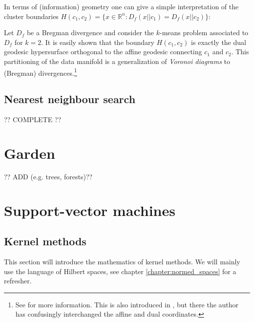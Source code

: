 {    In terms of (information) geometry one can give a simple interpretation of the cluster boundaries $H(c_1, c_2)=\{x\in\mathbb{R}^n:D_f(x||c_1)=D_f(x||c_2)\}$:
    \begin{property}
        Let $D_f$ be a Bregman divergence and consider the $k$-means problem associated to $D_f$ for $k=2$. It is easily shown that the boundary $H(c_1, c_2)$ is exactly the dual geodesic hypersurface orthogonal to the affine geodesic connecting $c_1$ and $c_2$. This partitioning of the data manifold is a generalization of \textit{Voronoi diagrams} to (Bregman) divergences.\footnote{See \cite{voronoi_bregman} for more information. This is also introduced in \cite{amari}, but there the author has confusingly interchanged the affine and dual coordinates.}
    \end{property}

\subsection{Nearest neighbour search}

    ?? COMPLETE ??

\section{Garden}

    ?? ADD (e.g. trees, forests)??

\section{Support-vector machines}
\subsection{Kernel methods}

    This section will introduce the mathematics of kernel methods. We will mainly use the language of Hilbert spaces, see chapter \ref{chapter:normed_spaces} for a refresher.

}
